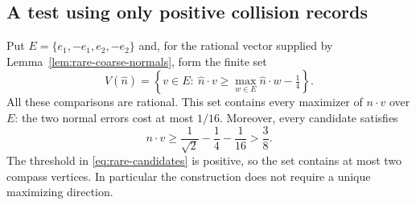 \subsection{A test using only positive collision records}
Put $E=\{e_1,-e_1,e_2,-e_2\}$ and, for the rational vector supplied
by Lemma~\ref{lem:rare-coarse-normals}, form the finite set
\begin{equation}\label{eq:rare-candidates}
 V(\widehat n)=
 \left\{v\in E:\ \widehat n\cdot v
       \ge\max_{w\in E}\widehat n\cdot w-\tfrac14\right\}.
\end{equation}
All these comparisons are rational. This set contains every maximizer
of $n\cdot v$ over $E$: the two normal errors cost at most $1/16$.
Moreover, every candidate satisfies
\begin{equation}\label{eq:rare-positive-normal}
 n\cdot v\ge\frac1{\sqrt2}-\frac14-\frac1{16}>\frac38.
\end{equation}
The threshold in \eqref{eq:rare-candidates} is positive, so the set
contains at most two compass vertices. In particular the construction
does not require a unique maximizing direction.

